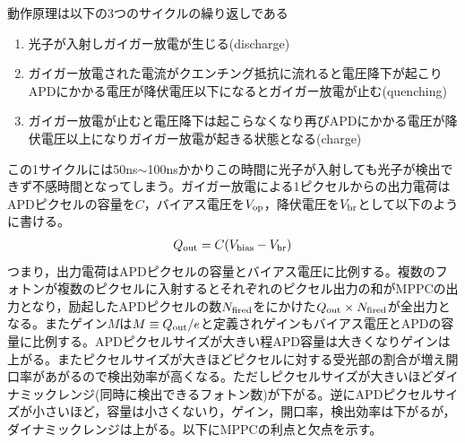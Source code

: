 動作原理は以下の3つのサイクルの繰り返しである
\begin{enumerate}
\item 光子が入射しガイガー放電が生じる(discharge)
\item ガイガー放電された電流がクエンチング抵抗に流れると電圧降下が起こりAPDにかかる電圧が降伏電圧以下になるとガイガー放電が止む(quenching)
\item ガイガー放電が止むと電圧降下は起こらなくなり再びAPDにかかる電圧が降伏電圧以上になりガイガー放電が起きる状態となる(charge)
\end{enumerate}
この1サイクルには50ns$\sim$100nsかかりこの時間に光子が入射しても光子が検出できず不感時間となってしまう。ガイガー放電による1ピクセルからの出力電荷はAPDピクセルの容量を$C$，バイアス電圧を$V_{\rm op}$，降伏電圧を$V_{\rm br}$として以下のように書ける。
\begin{align}
Q_{\rm out}=C(V_{\rm bias}-V_{\rm br})\label{eq:out}
\end{align}
つまり，出力電荷はAPDピクセルの容量とバイアス電圧に比例する。複数のフォトンが複数のピクセルに入射するとそれぞれのピクセル出力の和がMPPCの出力となり，励起したAPDピクセルの数$N_{\rm fired}$をにかけた$Q_{\rm out}\times N_{\rm fired}$が全出力となる。またゲイン$M$は$M\equiv Q_{\rm out}/e$と定義されゲインもバイアス電圧とAPDの容量に比例する。APDピクセルサイズが大きい程APD容量は大きくなりゲインは上がる。またピクセルサイズが大きほどピクセルに対する受光部の割合が増え開口率があがるので検出効率が高くなる。ただしピクセルサイズが大きいほどダイナミックレンジ(同時に検出できるフォトン数)が下がる。逆にAPDピクセルサイズが小さいほど，容量は小さくないり，ゲイン，開口率，検出効率は下がるが，ダイナミックレンジは上がる。以下にMPPCの利点と欠点を示す。


